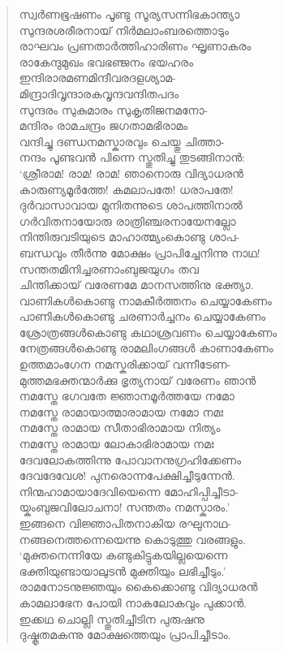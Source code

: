 \begin{verse}
സ്വര്‍ണഭൂഷണം പൂണ്ടു സൂര്യസന്നിഭകാന്ത്യാ\\
സുന്ദരശരീരനായ് നിര്‍മലാംബരത്തൊടും\\
രാഘവം പ്രണതാര്‍ത്തിഹാരിണം ഘൃണാകരം\\
രാകേന്ദുമുഖം ഭവഭഞ്ജനം ഭയഹരം\\
ഇന്ദിരാരമണമിന്ദീവരദളശ്യാമ-\\
മിന്ദ്രാദിവൃന്ദാരകവൃന്ദവന്ദിതപദം\\
സുന്ദരം സുകുമാരം സുകൃതിജനമനോ-\\
മന്ദിരം രാമചന്ദ്രം ജഗതാമഭിരാമം\\
വന്ദിച്ചു ദണ്ഡനമസ്കാരവും ചെയ്തു ചിത്താ-\\
നന്ദം പൂണ്ടവന്‍ പിന്നെ സ്തുതിച്ചു തുടങ്ങിനാന്‍:\\
‘ശ്രീരാമ! രാമ! രാമ! ഞാനൊരു വിദ്യാധരന്‍\\
കാരുണ്യമൂര്‍ത്തേ! കമലാപതേ! ധരാപതേ!\\
ദുര്‍വാസാവായ മുനിതന്നുടെ ശാപത്തിനാല്‍\\
ഗര്‍വിതനായോരു രാത്രിഞ്ചരനായേനല്ലോ\\
നിന്തിരുവടിയുടെ മാഹാത്മ്യംകൊണ്ടു ശാപ-\\
ബന്ധവും തീര്‍ന്നു മോക്ഷം പ്രാപിച്ചേനിന്നു നാഥ!\\
സന്തതമിനിച്ചരണാംബുജയുഗം തവ\\
ചിന്തിക്കായ് വരേണമേ മാനസത്തിനു ഭക്ത്യാ.\\
വാണികള്‍കൊണ്ടു നാമകീര്‍ത്തനം ചെയ്യാകേണം\\
പാണികള്‍കൊണ്ടു ചരണാര്‍ച്ചനം ചെയ്യാകേണം\\
ശ്രോത്രങ്ങള്‍കൊണ്ടു കഥാശ്രവണം ചെയ്യാകേണം\\
നേത്രങ്ങള്‍കൊണ്ടു രാമലിംഗങ്ങള്‍ കാണാകേണം\\
ഉത്തമാംഗേന നമസ്കരിക്കായ് വന്നീടേണ-\\
മുത്തമഭക്തന്മാര്‍ക്കു ഭൃത്യനായ് വരേണം ഞാന്‍\\
നമസ്തേ ഭഗവതേ ജ്ഞാനമൂര്‍ത്തയേ നമോ\\
നമസ്തേ രാമായാത്മാരാമായ നമോ നമഃ\\
നമസ്തേ രാമായ സീതാഭിരാമായ നിത്യം\\
നമസ്തേ രാമായ ലോകാഭിരാമായ നമഃ\\
ദേവലോകത്തിന്നു പോവാനനുഗ്രഹിക്കേണം\\
ദേവദേവേശ! പുനരൊന്നപേക്ഷിച്ചീടുന്നേന്‍.\\
നിന്മഹാമായാദേവിയെന്നെ മോഹിപ്പിച്ചീടാ-\\
യ്കംബുജവിലോചനാ! സന്തതം നമസ്കാരം.’\\
ഇങ്ങനെ വിജ്ഞാപിതനാകിയ രഘുനാഥ-\\
നങ്ങനെത്തന്നെയെന്നു കൊടുത്തു വരങ്ങളും.\\
‘മുക്തനെന്നിയേ കണ്ടുകിട്ടുകയില്ലയെന്നെ\\
ഭക്തിയുണ്ടായാലുടന്‍ മുക്തിയും ലഭിച്ചീടും.’\\
രാമനോടനുജ്ഞയും കൈക്കൊണ്ടു വിദ്യാധരന്‍\\
കാമലാഭേന പോയി നാകലോകവും പുക്കാന്‍.\\
ഇക്കഥ ചൊല്ലി സ്തുതിച്ചീടിന പുരുഷനു\\
ദുഷ്കൃതമകന്നു മോക്ഷത്തെയും പ്രാപിച്ചീടാം.
\end{verse}

